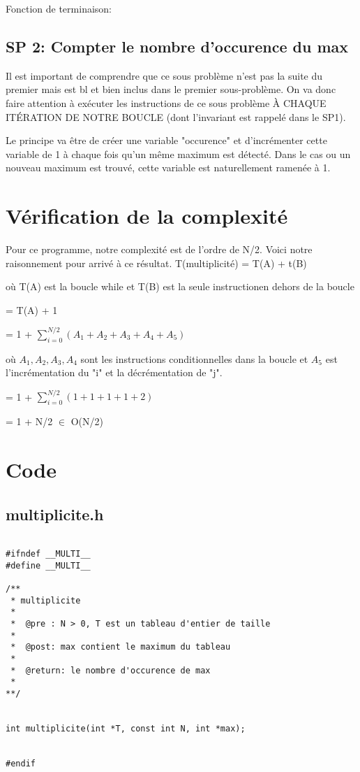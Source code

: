 \documentclass[a4paper, 11pt, oneside]{article}
\begin{document}
Fonction de terminaison:

\subsection{SP 2: Compter le nombre d'occurence du max}

Il est important de comprendre que ce sous problème n'est pas la suite du premier mais est bl et bien inclus dans le premier sous-problème. On va donc faire attention à exécuter les instructions de ce sous problème À CHAQUE ITÉRATION DE NOTRE BOUCLE (dont l'invariant est rappelé dans  le SP1).

Le principe va être de créer une variable "occurence" et d'incrémenter cette variable de 1 à chaque fois qu'un même maximum est détecté. Dans le cas ou un nouveau maximum est trouvé, cette variable est naturellement ramenée à 1.



\section{Vérification de la complexité}

Pour ce programme, notre complexité est de l'ordre de N/2. Voici notre raisonnement pour arrivé à ce résultat.
\bigskip
T(multiplicité) = T(A) + t(B)

où T(A) est la boucle while et T(B) est la seule instructionen dehors de la boucle

= T(A) + 1

= 1 + $\sum_{i = 0}^{N/2} (A_1 + A_2 + A_3 + A_4 + A_5)$

où $A_1, A_2, A_3, A_4$ sont les instructions conditionnelles dans la boucle et $A_5$ est l'incrémentation du "i" et la décrémentation de "j".

= 1 + $\sum_{i = 0}^{N/2} (1 + 1 + 1 + 1 + 2)$

= 1 + N/2 $\in$ O(N/2)


\section{Code}
\subsection{multiplicite.h}
\begin{lstlisting}[caption={Header}]

#ifndef __MULTI__
#define __MULTI__

/**
 * multiplicite
 *
 *  @pre : N > 0, T est un tableau d'entier de taille
 *
 *  @post: max contient le maximum du tableau
 *
 *  @return: le nombre d'occurence de max
 *
**/


int multiplicite(int *T, const int N, int *max);


#endif


\end{lstlisting}
\end{document}
